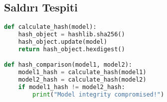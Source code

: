 \subsection{Saldırı Tespiti}

\begin{lstlisting}[language=Python]
def calculate_hash(model):
    hash_object = hashlib.sha256()
    hash_object.update(model)
    return hash_object.hexdigest()

def hash_comparison(model1, model2):
    model1_hash = calculate_hash(model1)
    model2_hash = calculate_hash(model2)
    if model1_hash != model2_hash:
        print("Model integrity compromised!")
\end{lstlisting}

\newpage